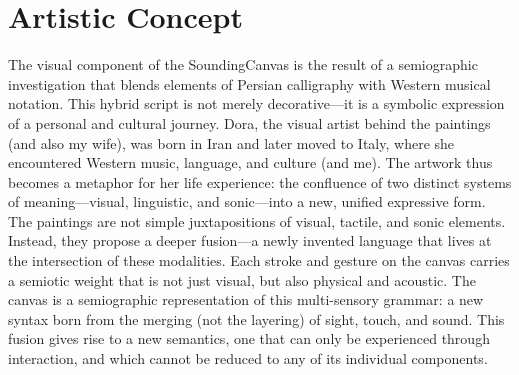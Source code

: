 \documentclass{article}
\begin{document}
\section{Artistic Concept}
 The visual component of the SoundingCanvas is the result of a semiographic investigation that blends elements of Persian calligraphy with Western musical notation. This hybrid script is not merely decorative—it is a symbolic expression of a personal and cultural journey. Dora, the visual artist behind the paintings (and also my wife), was born in Iran and later moved to Italy, where she encountered Western music, language, and culture (and me). The artwork thus becomes a metaphor for her life experience: the confluence of two distinct systems of meaning—visual, linguistic, and sonic—into a new, unified expressive form. \newline
 The paintings are not simple juxtapositions of visual, tactile, and sonic elements. Instead, they propose a deeper fusion—a newly invented language that lives at the intersection of these modalities. Each stroke and gesture on the canvas carries a semiotic weight that is not just visual, but also physical and acoustic. The canvas is a semiographic representation of this multi-sensory grammar: a new syntax born from the merging (not the layering) of sight, touch, and sound. This fusion gives rise to a new semantics, one that can only be experienced through interaction, and which cannot be reduced to any of its individual components.
\end{document}
